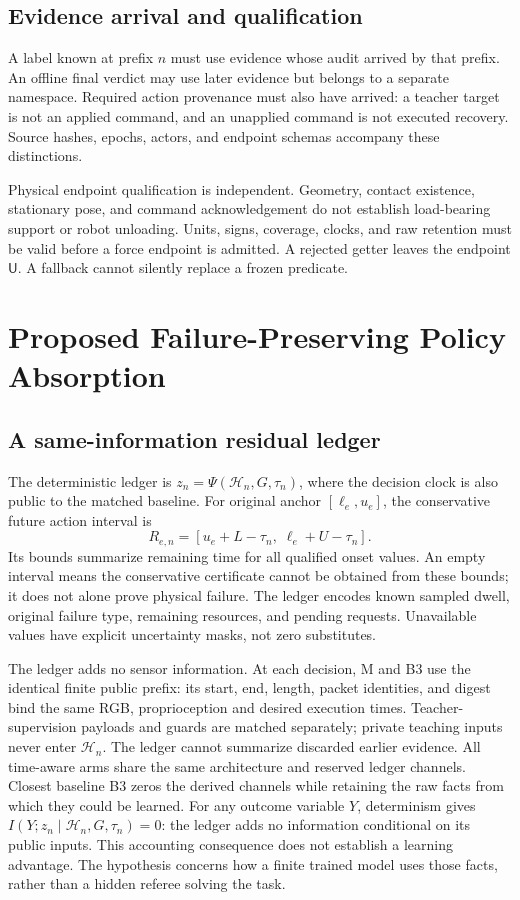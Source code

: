 \documentclass{article}
\newcommand{\Unk}{\ensuremath{\mathsf{U}}}
\newcommand{\Hist}{\mathcal{H}}
\begin{document}
\subsection{Evidence arrival and qualification}
A label known at prefix \(n\) must use evidence whose audit arrived by that prefix. An offline final verdict may use later evidence but belongs to a separate namespace. Required action provenance must also have arrived: a teacher target is not an applied command, and an unapplied command is not executed recovery. Source hashes, epochs, actors, and endpoint schemas accompany these distinctions.

Physical endpoint qualification is independent. Geometry, contact existence, stationary pose, and command acknowledgement do not establish load-bearing support or robot unloading. Units, signs, coverage, clocks, and raw retention must be valid before a force endpoint is admitted. A rejected getter leaves the endpoint \Unk. A fallback cannot silently replace a frozen predicate.

\section{Proposed Failure-Preserving Policy Absorption}
\subsection{A same-information residual ledger}
The deterministic ledger is \(z_n=\Psi(\Hist_n,G,\tau_n)\), where the decision clock is also public to the matched baseline. For original anchor \([\ell_e,u_e]\), the conservative future action interval is
\begin{equation}
R_{e,n}=[u_e+L-\tau_n,\;\ell_e+U-\tau_n].
\label{eq:residual}
\end{equation}
Its bounds summarize remaining time for all qualified onset values. An empty interval means the conservative certificate cannot be obtained from these bounds; it does not alone prove physical failure. The ledger encodes known sampled dwell, original failure type, remaining resources, and pending requests. Unavailable values have explicit uncertainty masks, not zero substitutes.

The ledger adds no sensor information. At each decision, M and B3 use the identical finite public prefix: its start, end, length, packet identities, and digest bind the same RGB, proprioception and desired execution times. Teacher-supervision payloads and guards are matched separately; private teaching inputs never enter $\Hist_n$. The ledger cannot summarize discarded earlier evidence. All time-aware arms share the same architecture and reserved ledger channels. Closest baseline B3 zeros the derived channels while retaining the raw facts from which they could be learned. For any outcome variable $Y$, determinism gives $I(Y;z_n\mid\Hist_n,G,\tau_n)=0$: the ledger adds no information conditional on its public inputs. This accounting consequence does not establish a learning advantage. The hypothesis concerns how a finite trained model uses those facts, rather than a hidden referee solving the task.
\end{document}
